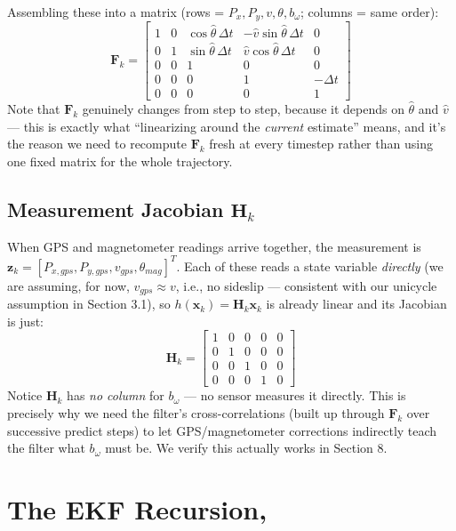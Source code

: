 \documentclass[11pt,a4paper]{article}
\begin{document}
Assembling these into a matrix (rows = $P_x,P_y,v,\theta,b_\omega$; columns = same order):
\begin{equation}
    \mathbf{F}_k = \begin{bmatrix}
    1 & 0 & \cos\hat\theta\,\Delta t & -\hat v\sin\hat\theta\,\Delta t & 0 \\
    0 & 1 & \sin\hat\theta\,\Delta t &  \hat v\cos\hat\theta\,\Delta t & 0 \\
    0 & 0 & 1 & 0 & 0 \\
    0 & 0 & 0 & 1 & -\Delta t \\
    0 & 0 & 0 & 0 & 1
    \end{bmatrix}
\end{equation}
Note that $\mathbf{F}_k$ genuinely changes from step to step, because it depends on $\hat\theta$ and $\hat v$ --- this is exactly what ``linearizing around the \emph{current} estimate'' means, and it's the reason we need to recompute $\mathbf{F}_k$ fresh at every timestep rather than using one fixed matrix for the whole trajectory.

\subsection{Measurement Jacobian $\mathbf{H}_k$}
When GPS and magnetometer readings arrive together, the measurement is $\mathbf{z}_k = [P_{x,gps}, P_{y,gps}, v_{gps}, \theta_{mag}]^T$. Each of these reads a state variable \emph{directly} (we are assuming, for now, $v_{gps} \approx v$, i.e., no sideslip --- consistent with our unicycle assumption in Section 3.1), so $h(\mathbf{x}_k) = \mathbf{H}_k\mathbf{x}_k$ is already linear and its Jacobian is just:
\begin{equation}
    \mathbf{H}_k = \begin{bmatrix}
       1 & 0 & 0 & 0 & 0 \\
       0 & 1 & 0 & 0 & 0 \\
       0 & 0 & 1 & 0 & 0 \\
       0 & 0 & 0 & 1 & 0
       \end{bmatrix}
\end{equation}
Notice $\mathbf{H}_k$ has \emph{no column} for $b_\omega$ --- no sensor measures it directly. This is precisely why we need the filter's cross-correlations (built up through $\mathbf{F}_k$ over successive predict steps) to let GPS/magnetometer corrections indirectly teach the filter what $b_\omega$ must be. We verify this actually works in Section 8.

\section{The EKF Recursion,}
\end{document}
